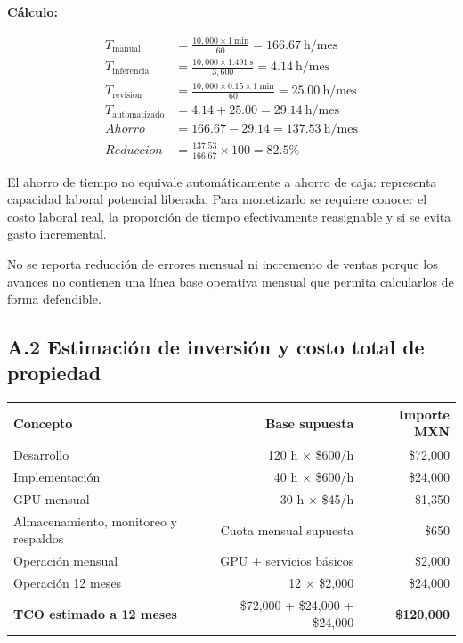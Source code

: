 \documentclass[letterpaper,11pt]{article}
\begin{document}
\textbf{Cálculo:}

\begin{align*}
T_{\text{manual}}
&=
\frac{10{,}000 \times 1\ \mathrm{min}}{60}
=
166.67\ \mathrm{h/mes}
\\
T_{\text{inferencia}}
&=
\frac{10{,}000 \times 1.491\ \mathrm{s}}{3{,}600}
=
4.14\ \mathrm{h/mes}
\\
T_{\text{revision}}
&=
\frac{10{,}000 \times 0.15 \times 1\ \mathrm{min}}{60}
=
25.00\ \mathrm{h/mes}
\\
T_{\text{automatizado}}
&=
4.14 + 25.00
=
29.14\ \mathrm{h/mes}
\\
Ahorro
&=
166.67 - 29.14
=
137.53\ \mathrm{h/mes}
\\
Reduccion
&=
\frac{137.53}{166.67}\times 100
=
82.5\%
\end{align*}

El ahorro de tiempo no equivale automáticamente a
ahorro de caja: representa capacidad laboral potencial
liberada. Para monetizarlo se requiere conocer el costo
laboral real, la proporción de tiempo efectivamente
reasignable y si se evita gasto incremental.

No se reporta reducción de errores mensual ni incremento
de ventas porque los avances no contienen una línea base
operativa mensual que permita calcularlos de forma defendible.


\subsection*{A.2 Estimación de inversión y costo total
de propiedad}

\begin{center}
\small
\begin{tabularx}{\linewidth}{@{}Xrr@{}}
\toprule
\textbf{Concepto} &
\textbf{Base supuesta} &
\textbf{Importe MXN}\\
\midrule
Desarrollo & 120 h $\times$ \$600/h & \$72,000\\
Implementación & 40 h $\times$ \$600/h & \$24,000\\
GPU mensual & 30 h $\times$ \$45/h & \$1,350\\
Almacenamiento, monitoreo y respaldos &
Cuota mensual supuesta & \$650\\
Operación mensual & GPU + servicios básicos & \$2,000\\
Operación 12 meses & 12 $\times$ \$2,000 & \$24,000\\
\midrule
\textbf{TCO estimado a 12 meses} &
\$72,000 + \$24,000 + \$24,000 &
\textbf{\$120,000}\\
\bottomrule
\end{tabularx}
\end{center}
\end{document}
